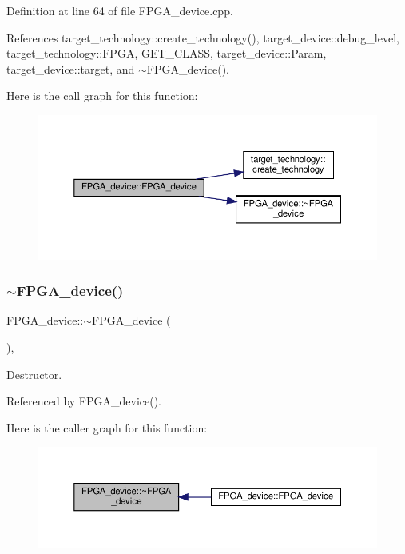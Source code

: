 Definition at line 64 of file F\+P\+G\+A\+\_\+device.\+cpp.



References target\+\_\+technology\+::create\+\_\+technology(), target\+\_\+device\+::debug\+\_\+level, target\+\_\+technology\+::\+F\+P\+GA, G\+E\+T\+\_\+\+C\+L\+A\+SS, target\+\_\+device\+::\+Param, target\+\_\+device\+::target, and $\sim$\+F\+P\+G\+A\+\_\+device().

Here is the call graph for this function\+:
\nopagebreak
\begin{figure}[H]
\begin{center}
\leavevmode
\includegraphics[width=350pt]{db/dd5/classFPGA__device_a7c2ceb21b31c8936187ba4d44cebd653_cgraph}
\end{center}
\end{figure}
\mbox{\label{classFPGA__device_a3060491c49280b5d364d92ee8ab27934}} 
\subsubsection{\texorpdfstring{$\sim$\+F\+P\+G\+A\+\_\+device()}{~FPGA\_device()}}
{\footnotesize\ttfamily F\+P\+G\+A\+\_\+device\+::$\sim$\+F\+P\+G\+A\+\_\+device (\begin{DoxyParamCaption}{ }\end{DoxyParamCaption})\hspace{0.3cm}{\ttfamily [override]}, {\ttfamily [default]}}



Destructor. 



Referenced by F\+P\+G\+A\+\_\+device().

Here is the caller graph for this function\+:
\nopagebreak
\begin{figure}[H]
\begin{center}
\leavevmode
\includegraphics[width=350pt]{db/dd5/classFPGA__device_a3060491c49280b5d364d92ee8ab27934_icgraph}
\end{center}
\end{figure}


